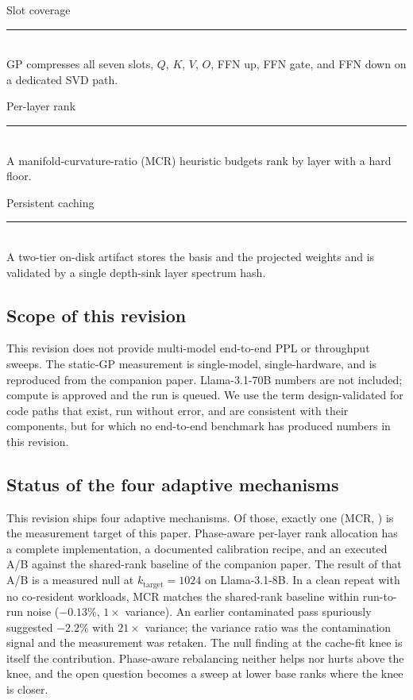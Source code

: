 \documentclass[11pt]{article}
\begin{document}
\begin{center}
\begin{minipage}[t]{0.31\linewidth}\centering\small
Slot coverage\\[2pt]
\rule{0.7\linewidth}{0.4pt}\\[2pt]
GP compresses all seven slots, $Q$, $K$, $V$, $O$, FFN up, FFN gate, and
FFN down on a dedicated SVD path.
\end{minipage}\hfill
\begin{minipage}[t]{0.31\linewidth}\centering\small
Per-layer rank\\[2pt]
\rule{0.7\linewidth}{0.4pt}\\[2pt]
A manifold-curvature-ratio (MCR) heuristic budgets rank by layer with a
hard floor.
\end{minipage}\hfill
\begin{minipage}[t]{0.31\linewidth}\centering\small
Persistent caching\\[2pt]
\rule{0.7\linewidth}{0.4pt}\\[2pt]
A two-tier on-disk artifact stores the basis and the projected weights
and is validated by a single depth-sink layer spectrum hash.
\end{minipage}
\end{center}

\subsection{Scope of this revision}
This revision does not provide multi-model end-to-end PPL or throughput
sweeps. The static-GP measurement is single-model, single-hardware, and
is reproduced from the companion paper. Llama-3.1-70B numbers are not
included; compute is approved and the run is queued. We use the term
design-validated for code paths that exist, run without error, and are
consistent with their components, but for which no end-to-end benchmark
has produced numbers in this revision.

\subsection{Status of the four adaptive mechanisms}
This revision ships four adaptive mechanisms. Of those, exactly one
(MCR, ) is the measurement target of this paper.
Phase-aware per-layer rank allocation has a complete implementation, a
documented calibration recipe, and an executed A/B against the
shared-rank baseline of the companion paper. The result of that A/B is
a measured null at $k_\text{target}{=}1024$ on Llama-3.1-8B. In a clean
repeat with no co-resident workloads, MCR matches the shared-rank
baseline within run-to-run noise ($-0.13\%$, $1{\times}$ variance). An
earlier contaminated pass spuriously suggested $-2.2\%$ with $21{\times}$
variance; the variance ratio was the contamination signal and the
measurement was retaken. The null finding at the cache-fit knee is
itself the contribution. Phase-aware rebalancing neither helps nor
hurts above the knee, and the open question becomes a sweep at lower
base ranks where the knee is closer.
\end{document}
